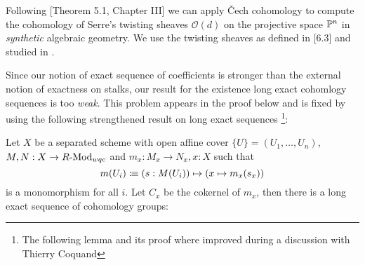 
Following \cite{Hartshorne}[Theorem 5.1, Chapter III] we can apply \v{C}ech cohomology to compute
the cohomology of Serre's twisting sheaves $\mathcal O(d)$ on the projective space $\mathbb{P}^n$ in \emph{synthetic} algebraic geometry.
We use the twisting sheaves as defined in \cite{draft}[6.3] and studied in \cite{sag-projective}.

Since our notion of exact sequence of coefficients is stronger than the external notion of exactness on stalks, our result for the existence long exact cohomlogy sequences is too \emph{weak}.
This problem appears in the proof below and is fixed by using the following strengthened result on long exact sequences
\footnote{The following lemma and its proof where improved during a discussion with Thierry Coquand}:

\begin{lemma}
  \label{local-les}
  Let $X$ be a separated scheme with open affine cover $\{U\}=(U_1,\dots,U_n)$,
  $M,N:X\to R\text{-}\mathrm{Mod}_{wqc}$ and $m_x:M_x\to N_x, x:X$ such that
  \[
    m(U_i)\vcentcolon\mspace{-1.2mu}\equiv (s:M(U_i)) \mapsto (x\mapsto m_x(s_x))
  \]
  is a monomorphism for all $i$.
  Let $C_x$ be the cokernel of $m_x$, then there is a long exact sequence of cohomology groups:
  \begin{center}
  \end{center}
\end{lemma}

